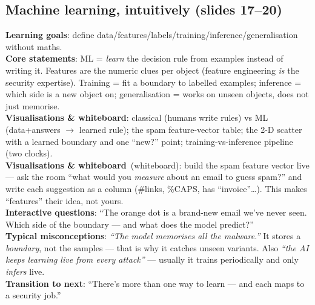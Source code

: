 \documentclass[11pt,a4paper]{article}
\newcommand{\obj}{\textbf{\color{accent}Learning goals}}
\newcommand{\core}{\textbf{\color{accent}Core statements}}
\newcommand{\viz}{\textbf{\color{accent}Visualisations \& whiteboard}}
\newcommand{\ask}{\textbf{\color{accent}Interactive questions}}
\newcommand{\misc}{\textbf{\color{bad}Typical misconceptions}}
\newcommand{\trans}{\textbf{\color{mlsig}Transition to next}}
\begin{document}
\subsection{Machine learning, intuitively (slides 17--20)}
\obj: define data/features/labels/training/inference/generalisation without maths.\\
\core: ML = \emph{learn} the decision rule from examples instead of writing it.
Features are the numeric clues per object (feature engineering \emph{is} the
security expertise). Training = fit a boundary to labelled examples; inference =
which side is a new object on; generalisation = works on unseen objects, does not
just memorise.\\
\viz: classical (humans write rules) vs ML (data+answers $\to$ learned rule); the
spam feature-vector table; the 2-D scatter with a learned boundary and one
``new?'' point; training-vs-inference pipeline (two clocks).\\
\viz\ (whiteboard): build the spam feature vector live --- ask the room ``what
would you \emph{measure} about an email to guess spam?'' and write each suggestion
as a column (\#links, \%CAPS, has ``invoice''\ldots). This makes ``features''
their idea, not yours.\\
\ask: ``The orange dot is a brand-new email we've never seen. Which side of the
boundary --- and what does the model predict?''\\
\misc: \emph{``The model memorises all the malware.''} It stores a \emph{boundary},
not the samples --- that is why it catches unseen variants. Also \emph{``the AI
keeps learning live from every attack''} --- usually it trains periodically and
only \emph{infers} live.\\
\trans: ``There's more than one way to learn --- and each maps to a security job.''
\end{document}

